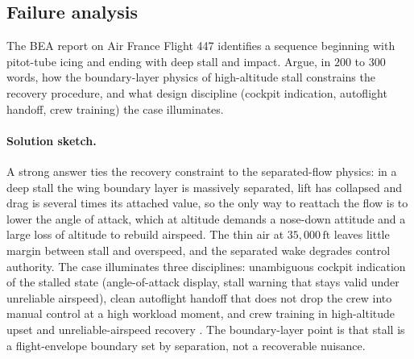 \subsection*{Failure analysis}

\begin{exercise}
The BEA report on Air France Flight 447 \cite{acc:bea-af447}
identifies a sequence beginning with pitot-tube icing and ending
with deep stall and impact. Argue, in $200$ to $300$ words, how
the boundary-layer physics of high-altitude stall constrains the
recovery procedure, and what design discipline (cockpit
indication, autoflight handoff, crew training) the case
illuminates.

\paragraph{Solution sketch.} A strong answer ties the recovery
constraint to the separated-flow physics: in a deep stall the wing
boundary layer is massively separated, lift has collapsed and drag is
several times its attached value, so the only way to reattach the
flow is to lower the angle of attack, which at altitude demands a
nose-down attitude and a large loss of altitude to rebuild airspeed.
The thin air at $35{,}000\,\text{ft}$ leaves little margin between
stall and overspeed, and the separated wake degrades control
authority. The case illuminates three disciplines: unambiguous
cockpit indication of the stalled state (angle-of-attack display,
stall warning that stays valid under unreliable airspeed), clean
autoflight handoff that does not drop the crew into manual control at
a high workload moment, and crew training in high-altitude upset and
unreliable-airspeed recovery \cite{acc:bea-af447}. The
boundary-layer point is that stall is a flight-envelope boundary set
by separation, not a recoverable nuisance.
\end{exercise}

